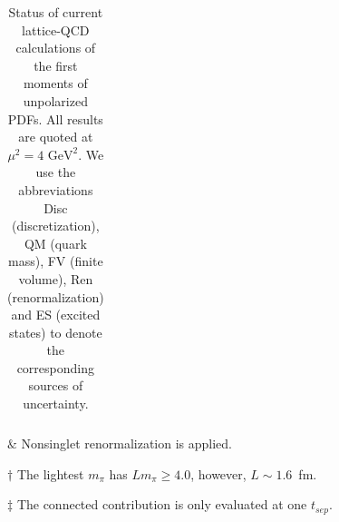 \begin{table}[!t]
\begin{threeparttable}
\begin{tabular}{llcllccccccl}
\bottomrule
\end{tabular}
\begin{tablenotes}
\scriptsize
\item[$\&$] Nonsinglet renormalization is applied.
\item[$\dagger$] The lightest $m_\pi$ has $Lm_\pi\ge 4.0$, however, 
$L\sim 1.6$~fm.
\item[$\ddag$] The connected contribution is only evaluated at one $t_{sep}$.
\end{tablenotes}
\end{threeparttable}
\caption{\small Status of current lattice-QCD calculations of the first 
moments of unpolarized PDFs.
%
All results are quoted at $\mu^2=4\mbox{ GeV}^2$.
%
We use the abbreviations Disc (discretization), QM (quark mass),
FV (finite volume), Ren (renormalization) and ES (excited states)
to denote the corresponding sources of uncertainty.}
\label{tab:unpolLQCDstatus1B}
\end{table}

